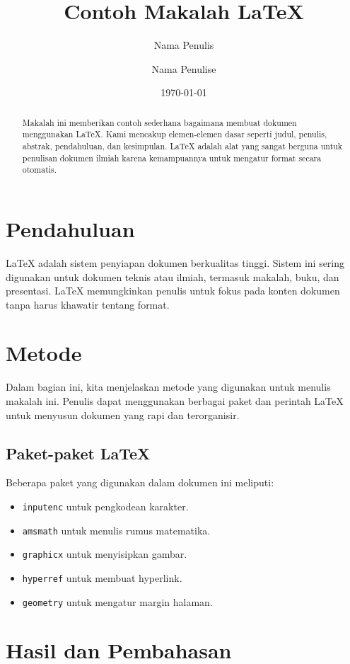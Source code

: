 \documentclass[a4paper,12pt]{article}
\title{Contoh Makalah LaTeX}
\author{{Nama Penulis}\and
{Nama Penulise}}
\date{\today}
\begin{document}
\maketitle

\begin{abstract}
Makalah ini memberikan contoh sederhana bagaimana membuat dokumen menggunakan LaTeX. Kami mencakup elemen-elemen dasar seperti judul, penulis, abstrak, pendahuluan, dan kesimpulan. LaTeX adalah alat yang sangat berguna untuk penulisan dokumen ilmiah karena kemampuannya untuk mengatur format secara otomatis.
\end{abstract}

\section{Pendahuluan}
\label{sec:intro}

LaTeX adalah sistem penyiapan dokumen berkualitas tinggi. Sistem ini sering digunakan untuk dokumen teknis atau ilmiah, termasuk makalah, buku, dan presentasi. LaTeX memungkinkan penulis untuk fokus pada konten dokumen tanpa harus khawatir tentang format.

\section{Metode}

Dalam bagian ini, kita menjelaskan metode yang digunakan untuk menulis makalah ini. Penulis dapat menggunakan berbagai paket dan perintah LaTeX untuk menyusun dokumen yang rapi dan terorganisir.

\subsection{Paket-paket LaTeX}
Beberapa paket yang digunakan dalam dokumen ini meliputi:
\begin{itemize}
    \item \texttt{inputenc} untuk pengkodean karakter.
    \item \texttt{amsmath} untuk menulis rumus matematika.
    \item \texttt{graphicx} untuk menyisipkan gambar.
    \item \texttt{hyperref} untuk membuat hyperlink.
    \item \texttt{geometry} untuk mengatur margin halaman.
\end{itemize}

\section{Hasil dan Pembahasan}
\end{document}
